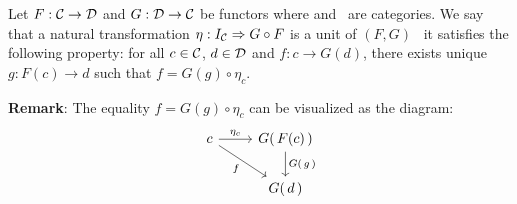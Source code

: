 \begin{defin}\label{Adj:def:unit}
    Let $F:\mbox{$\cal C$}\to\mbox{$\cal D$}$ and $G:\mbox{$\cal D$}\to\mbox{$\cal C$}$ be functors where \Cat and \Dat\ 
    are categories. We say that a natural transformation 
    $\eta:I_{\cal C}\Rightarrow G\circ F$ is a unit of $(F,G)$ \ifand\ 
    it satisfies the following property: for all $c\in\mbox{$\cal C$}$, 
    $d\in\mbox{$\cal D$}$ and $f:c\to G(d)$, there exists unique  
    $g:F(c) \to d$ such that $f = G(g) \circ \eta_{c}$.
\end{defin}

\noindent
{\bf Remark}: The equality $f = G(g) \circ \eta_{c}$ can be visualized as
the diagram:
    \[
        \begin{tikzcd}
            c \arrow[rd,swap, "f"]\arrow[r,"\eta_{c}"] 
            &G(\,F(c)\,)\arrow[d,"G(\,g\,)"]\\
            & G(\,d\,)
        \end{tikzcd}
    \]


